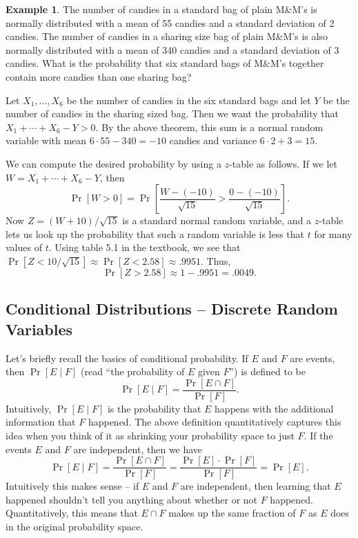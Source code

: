 \documentclass[12pt]{article}
\theoremstyle{plain}
\theoremstyle{definition}
\newtheorem{example}[theorem]{Example}
\theoremstyle{remark}
\begin{document}
\begin{example}
    The number of candies in a standard bag of plain M\&M's is normally distributed with a mean of 55 candies and a standard deviation of 2 candies.
    The number of candies in a sharing size bag of plain M\&M's is also normally distributed with a mean of 340 candies and a standard deviation of 3 candies.
    What is the probability that six standard bags of M\&M's together contain more candies than one sharing bag?

    Let $X_1, \ldots, X_6$ be the number of candies in the six standard bags and let $Y$ be the number of candies in the sharing sized bag.
    Then we want the probability that $X_1 + \cdots + X_6 - Y > 0$.
    By the above theorem, this sum is a normal random variable with mean $6\cdot 55 - 340 = -10$ candies and variance $6\cdot 2 + 3 = 15$.

    We can compute the desired probability by using a $z$-table as follows.
    If we let $W = X_1 + \cdots + X_6 - Y$, then
    \[
        \Pr[W > 0] = \Pr\left[\frac{W-(-10)}{\sqrt{15}} > \frac{0 - (-10)}{\sqrt{15}}\right].
    \]
    Now $Z = (W+10)/\sqrt{15}$ is a standard normal random variable, and a $z$-table lets us look up the probability that such a random variable is less that $t$ for many values of $t$.
    Using table 5.1 in the textbook, we see that $\Pr[Z < 10/\sqrt{15}] \approx \Pr[Z< 2.58] \approx  .9951$.
    Thus,
    \[
        \Pr[Z > 2.58] \approx 1- .9951 = .0049.
    \]
\end{example}










\subsection{Conditional Distributions -- Discrete Random Variables}

Let's briefly recall the basics of conditional probability.
If $E$ and $F$ are events, then $\Pr[E \mid F]$ (read ``the probability of $E$ given $F$'') is defined to be
\[
    \Pr[E\mid F] = \frac{\Pr[E \cap F]}{\Pr[F]}.
\]
Intuitively, $\Pr[E\mid F]$ is the probability that $E$ happens with the additional information that $F$ happened.
The above definition quantitatively captures this idea when you think of it as shrinking your probability space to just $F$.
If the events $E$ and $F$ are independent, then we  have
\[
    \Pr[E\mid F] = \frac{\Pr[E\cap F]}{\Pr[F]} = \frac{\Pr[E]\cdot \Pr[F]}{\Pr[F]} = \Pr[E].
\]
Intuitively this makes sense -- if $E$ and $F$ are independent, then learning that $E$ happened shouldn't tell you anything about whether or not $F$ happened.
Quantitatively, this means that $E\cap F$ makes up the same fraction of $F$ as $E$ does in the original probability space.
\end{document}
